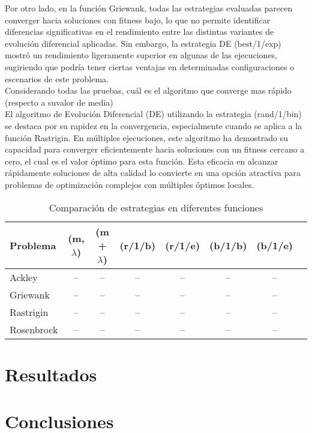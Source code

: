 \documentclass{report}
\begin{document}
Por otro lado, en la función Griewank, todas las estrategias evaluadas parecen converger hacia soluciones con fitness bajo, lo que no permite identificar diferencias significativas en el rendimiento entre las distintas variantes de evolución diferencial aplicadas. Sin embargo, la estrategia DE (best/1/exp) mostró un rendimiento ligeramente superior en algunas de las ejecuciones, sugiriendo que podría tener ciertas ventajas en determinadas configuraciones o escenarios de este problema.\\

Considerando todas las pruebas, cuál es el algoritmo que converge mas rápido (respecto a suvalor de media)\\
El algoritmo de Evolución Diferencial (DE) utilizando la estrategia (rand/1/bin) se destaca por su rapidez en la convergencia, especialmente cuando se aplica a la función Rastrigin. En múltiples ejecuciones, este algoritmo ha demostrado su capacidad para converger eficientemente hacia soluciones con un fitness cercano a cero, el cual es el valor óptimo para esta función. Esta eficacia en alcanzar rápidamente soluciones de alta calidad lo convierte en una opción atractiva para problemas de optimización complejos con múltiples óptimos locales.\\

\begin{table}[ht]
\centering
\caption{Comparación de estrategias en diferentes funciones}
\begin{tabular}{>{\raggedright}p{3cm}ccccccc}
\toprule
\textbf{Problema} & \textbf{(m, $\lambda$)} & \textbf{(m + $\lambda$)} & \textbf{(r/1/b)} & \textbf{(r/1/e)} & \textbf{(b/1/b)} & \textbf{(b/1/e)} \\
\midrule
Ackley & -- & -- & -- & -- & -- & -- \\
Griewank & -- & -- & -- & -- & -- & -- \\
Rastrigin & -- & -- & -- & -- & -- & -- \\
Rosenbrock & -- & -- & -- & -- & -- & -- \\
\bottomrule
\end{tabular}
\end{table}

\section{Resultados}

\section{Conclusiones}
\end{document}

